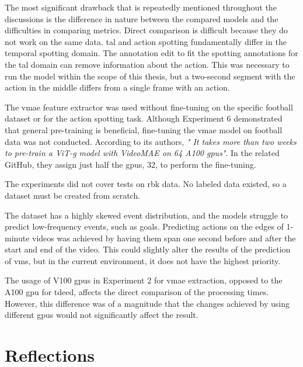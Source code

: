The most significant drawback that is repeatedly mentioned throughout the discussions is the difference in nature between the compared models and the difficulties in comparing metrics. Direct comparison is difficult because they do not work on the same data. \acrfull{tal} and action spotting fundamentally differ in the temporal spotting domain. The annotation edit to fit the spotting annotations for the \acrshort{tal} domain can remove information about the action. This was necessary to run the model within the scope of this thesis, but a two-second segment with the action in the middle differs from a single frame with an action. 

The \acrshort{vmae} feature extractor was used without fine-tuning on the specific football dataset or for the action spotting task. Although Experiment 6 demonstrated that general pre-training is beneficial, fine-tuning the \acrshort{vmae} model on football data was not conducted. According to its authors, \textit{" It takes more than two weeks to pre-train a ViT-g model with VideoMAE on 64 A100 \acrshort{gpu}s"}\cite{wang_videomae_2023}. In the related GitHub, they assign just half the \acrshort{gpu}s, 32, to perform the fine-tuning. 

The experiments did not cover tests on \acrfull{rbk} data. No labeled data existed, so a dataset must be created from scratch. 

The dataset has a highly skewed event distribution, and the models struggle to predict low-frequency events, such as goals. Predicting actions on the edges of 1-minute videos was achieved by having them span one second before and after the start and end of the video. This could slightly alter the results of the prediction of \acrshort{vms}, but in the current environment, it does not have the highest priority. 

The usage of V100 \acrshort{gpu}s in Experiment 2 for \acrshort{vmae} extraction, opposed to the A100 \acrshort{gpu} for \acrshort{tdeed}, affects the direct comparison of the processing times. However, this difference was of a magnitude that the changes achieved by using different \acrshort{gpu}s would not significantly affect the result. 

\section{Reflections}

